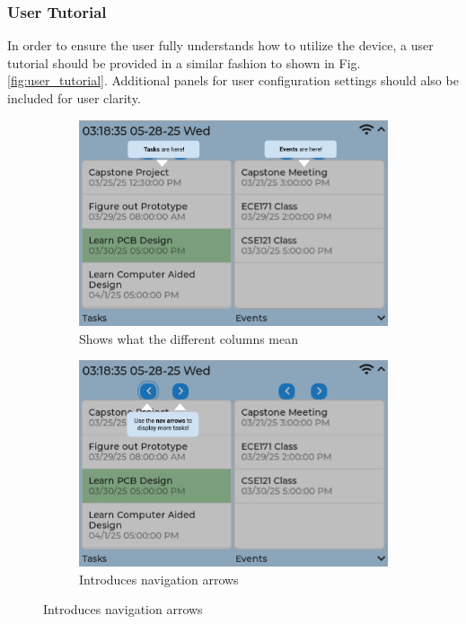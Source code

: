 \subsubsection{User Tutorial}
In order to ensure the user fully understands how to utilize the device, a user tutorial should be provided in a similar fashion to shown in Fig. \ref{fig:user_tutorial}. Additional panels for user configuration settings should also be included for user clarity.
\begin{figure}[h]
    \begin{subfigure}{0.5\textwidth}
        \includegraphics[width = \textwidth]{task_event.png}
        \caption{Shows what the different columns mean}
    \end{subfigure}
    \begin{subfigure}{0.5\textwidth}
        \includegraphics[width = \textwidth]{nav_arrows.png}
        \caption{Introduces navigation arrows}

\end{subfigure}
\end{figure}
